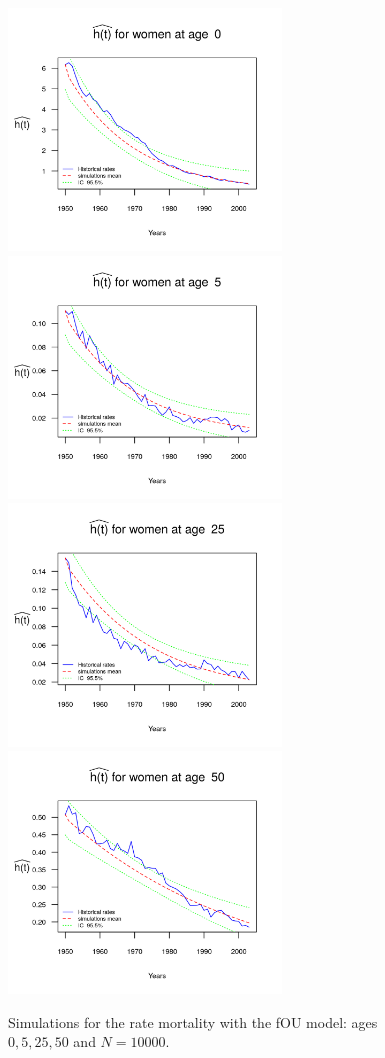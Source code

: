 \documentclass[smallextended]{svjour3}
\begin{document}
\begin{figure}[H]
    \includegraphics[width = 2.85in]{PlotWomen0.png}
    \includegraphics[width = 2.85in]{PlotWomen5.png}
    \includegraphics[width = 2.85in]{PlotWomen25.png}
    \includegraphics[width = 2.85in]{PlotWomen50.png}
    \caption{Simulations for the rate mortality with the fOU model: ages 
    $0,5,25,50$ and $N=10000$.}
    \label{graph-simu_FOU1}
\end{figure}\vspace*{0.1cm}
\end{document}
